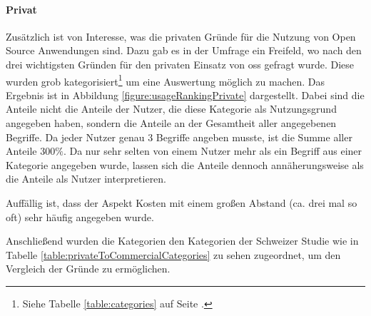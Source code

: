 \documentclass[a4paper]{article}
\begin{document}
            \paragraph{Privat}
                Zusätzlich ist von Interesse, was die privaten Gründe für die Nutzung von Open Source Anwendungen sind. Dazu gab es in der Umfrage ein Freifeld, wo nach den drei wichtigsten Gründen für den privaten Einsatz von \gls{oss} gefragt wurde. Diese wurden grob kategorisiert\footnote{Siehe Tabelle \ref{table:categories} auf Seite \pageref{table:categories}.} um eine Auswertung möglich zu machen. Das Ergebnis ist in Abbildung \ref{figure:usageRankingPrivate} dargestellt. Dabei sind die Anteile nicht die Anteile der Nutzer, die diese Kategorie als Nutzungsgrund angegeben haben, sondern die Anteile an der Gesamtheit aller angegebenen Begriffe. Da jeder Nutzer genau 3 Begriffe angeben musste, ist die Summe aller Anteile $300\%$. Da nur sehr selten von einem Nutzer mehr als ein Begriff aus einer Kategorie angegeben wurde, lassen sich die Anteile dennoch annäherungsweise als die Anteile als Nutzer interpretieren.
                
                Auffällig ist, dass der Aspekt Kosten mit einem großen Abstand (ca. drei mal so oft) sehr häufig angegeben wurde.
                
                Anschließend wurden die Kategorien den Kategorien der Schweizer Studie wie in Tabelle \ref{table:privateToCommercialCategories} zu sehen zugeordnet, um den Vergleich der Gründe zu ermöglichen.
                
\end{document}
